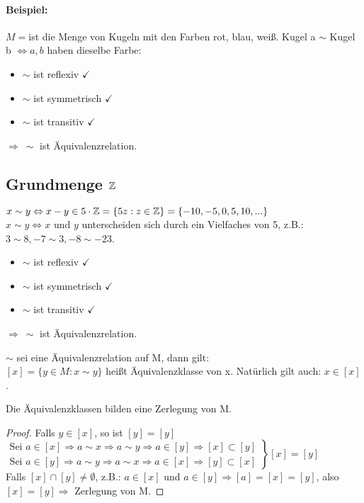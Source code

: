 \paragraph{Beispiel:}$M=$ist die Menge von Kugeln mit den Farben rot, blau, weiß. Kugel a $\sim$ Kugel b $\Leftrightarrow a,b$ haben dieselbe Farbe:
\begin{itemize}
\item $\sim$ ist reflexiv $\checkmark$
\item $\sim$ ist symmetrisch $\checkmark$
\item $\sim$ ist transitiv $\checkmark$
\end{itemize}
$\Rightarrow\ \sim$ ist Äquivalenzrelation.

\subsection{Grundmenge $\mathbb{Z}$}
$x\sim y \Leftrightarrow x-y\in 5\cdot \mathbb{Z}=\{5z:z\in\mathbb{Z}\}=\{-10,-5,0,5,10,...\}$\\
$x\sim y \Leftrightarrow x \textrm{ und } y$ unterscheiden sich durch ein Vielfaches von 5, z.B.: $3\sim 8, -7\sim 3, -8\sim -23$. 
\begin{itemize}
\item $\sim$ ist reflexiv $\checkmark$
\item $\sim$ ist symmetrisch $\checkmark$
\item $\sim$ ist transitiv $\checkmark$
\end{itemize}
$\Rightarrow\ \sim$ ist Äquivalenzrelation.

\begin{defi}[Äquivalenzklassen]
$\sim$ sei eine Äquivalenzrelation auf M, dann gilt:\\
$[x]=\{y\in M: x\sim y\}$ heißt Äquivalenzklasse von x. Natürlich gilt auch: $x\in[x]$.
\end{defi}

\begin{satz}
Die Äquivalenzklassen bilden eine Zerlegung von M. 
\end{satz}
\begin{proof}
Falls $y\in [x]$, so ist $[y]=[y]$\\
$\left.
\begin{array}{c}
\textrm{Sei } a\in [x] \Rightarrow a\sim x \Rightarrow a\sim y \Rightarrow a\in [y] \Rightarrow [x]\subset [y] \\ 
\textrm{Sei } a\in [y] \Rightarrow a\sim y \Rightarrow a\sim x \Rightarrow a\in [x] \Rightarrow [y] \subset [x]
\end{array} 
\right\}[x]=[y]$\\
Falls $[x] \cap [y] \neq \emptyset$, z.B.: $a\in [x]$ und $a\in [y] \Rightarrow [a]=[x]=[y]$, also $[x]=[y] \Rightarrow$ Zerlegung von M. 
\end{proof}

